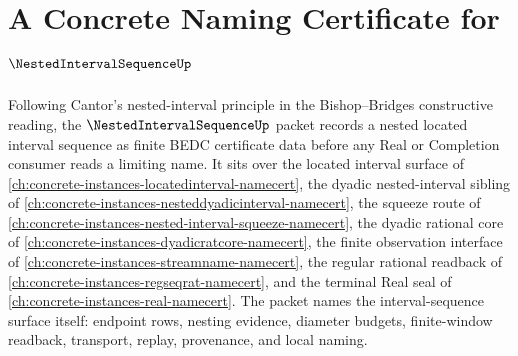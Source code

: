 \chapter{A Concrete Naming Certificate for $\NestedIntervalSequenceUp$}
\label{ch:concrete-instances-nested-interval-sequence-namecert}

Following Cantor's nested-interval principle in the Bishop--Bridges constructive reading, the $\NestedIntervalSequenceUp$ packet records a nested located interval sequence as finite BEDC certificate data before any Real or Completion consumer reads a limiting name. It sits over the located interval surface of \autoref{ch:concrete-instances-locatedinterval-namecert}, the dyadic nested-interval sibling of \autoref{ch:concrete-instances-nesteddyadicinterval-namecert}, the squeeze route of \autoref{ch:concrete-instances-nested-interval-squeeze-namecert}, the dyadic rational core of \autoref{ch:concrete-instances-dyadicratcore-namecert}, the finite observation interface of \autoref{ch:concrete-instances-streamname-namecert}, the regular rational readback of \autoref{ch:concrete-instances-regseqrat-namecert}, and the terminal Real seal of \autoref{ch:concrete-instances-real-namecert}. The packet names the interval-sequence surface itself: endpoint rows, nesting evidence, diameter budgets, finite-window readback, transport, replay, provenance, and local naming.


